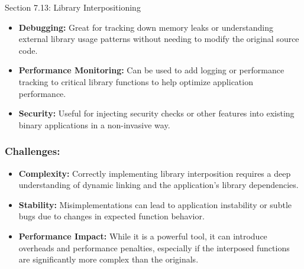 \begin{notes}{Section 7.13: Library Interpositioning}
    \begin{itemize}
        \item \textbf{Debugging:} Great for tracking down memory leaks or understanding external library usage patterns without needing to modify the original source code.
        \item \textbf{Performance Monitoring:} Can be used to add logging or performance tracking to critical library functions to help optimize application performance.
        \item \textbf{Security:} Useful for injecting security checks or other features into existing binary applications in a non-invasive way.
    \end{itemize}
    
    \subsubsection*{Challenges:}
    
    \begin{itemize}
        \item \textbf{Complexity:} Correctly implementing library interposition requires a deep understanding of dynamic linking and the application’s library dependencies.
        \item \textbf{Stability:} Misimplementations can lead to application instability or subtle bugs due to changes in expected function behavior.
        \item \textbf{Performance Impact:} While it is a powerful tool, it can introduce overheads and performance penalties, especially if the interposed functions are significantly more complex than the originals.
    \end{itemize}    
\end{notes}